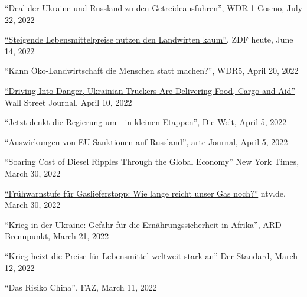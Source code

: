 \documentclass{article}
\begin{document}
\begin{minipage}[t]{0.8\textwidth}
    ``Deal der Ukraine und Russland zu den Getreideausfuhren'', WDR 1 Cosmo, July 22, 2022 \par
    \href{https://www.zdf.de/nachrichten/heute-19-uhr/bauerntag-luebeck-oezdemir-video-100.html}{``Steigende Lebensmittelpreise nutzen den Landwirten kaum''}, ZDF heute, June 14, 2022 \par
    ``Kann Öko-Landwirtschaft die Menschen statt machen?'', WDR5, April 20, 2022 \par
        \href{https://www.wsj.com/articles/driving-into-danger-ukrainian-truckers-are-delivering-food-cargo-and-aid-11649595601}{``Driving Into Danger, Ukrainian Truckers Are Delivering Food, Cargo and Aid''} Wall Street Journal, April 10, 2022 \par
    ``Jetzt denkt die Regierung um - in kleinen Etappen'', Die Welt, April 5, 2022 \par
    ``Auswirkungen von EU-Sanktionen auf Russland'', arte Journal, April 5, 2022 \par
    ``Soaring Cost of Diesel Ripples Through the Global Economy'' New York Times, March 30, 2022 \par
    \href{https://www.n-tv.de/wirtschaft/Wie-lange-reicht-unser-Gas-noch-article23234226.html}{``Frühwarnstufe für Gaslieferstopp: Wie lange reicht unser Gas noch?''} ntv.de, March 30, 2022 \par
    ``Krieg in der Ukraine: Gefahr für die Ernährungssicherheit in Afrika'', ARD Brennpunkt, March 21, 2022 \par
    \href{https://www.derstandard.de/story/2000134038874/krieg-heizt-die-preise-fuer-lebensmittel-weltweit-stark-an}{``Krieg heizt die Preise für Lebensmittel weltweit stark an''} Der Standard, March 12, 2022 \par
    ``Das Risiko China'', FAZ, March 11, 2022 \par
\end{minipage}
\medskip
\end{document}
